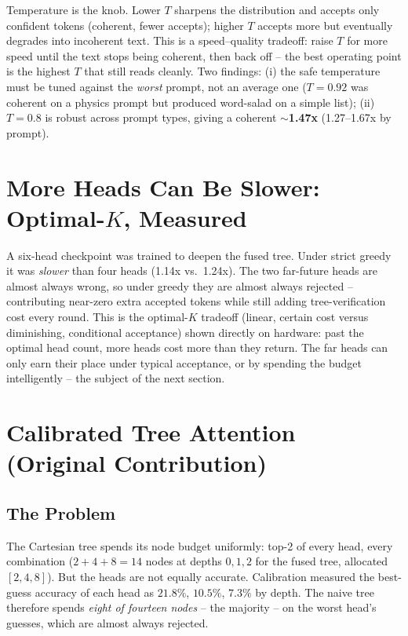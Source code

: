 \documentclass[12pt, a4paper]{article}
\begin{document}
Temperature is the knob. Lower $T$ sharpens the distribution and accepts only confident tokens
(coherent, fewer accepts); higher $T$ accepts more but eventually degrades into incoherent text.
This is a speed--quality tradeoff: raise $T$ for more speed until the text stops being coherent,
then back off -- the best operating point is the highest $T$ that still reads cleanly. Two
findings: (i) the safe temperature must be tuned against the \emph{worst} prompt, not an average
one ($T{=}0.92$ was coherent on a physics prompt but produced word-salad on a simple list);
(ii) $T{=}0.8$ is robust across prompt types, giving a coherent $\sim$\textbf{1.47x} (1.27--1.67x
by prompt).

\section{More Heads Can Be Slower: Optimal-\texorpdfstring{$K$}{K}, Measured}

A six-head checkpoint was trained to deepen the fused tree. Under strict greedy it was
\emph{slower} than four heads (1.14x vs.\ 1.24x). The two far-future heads are almost always
wrong, so under greedy they are almost always rejected -- contributing near-zero extra accepted
tokens while still adding tree-verification cost every round. This is the optimal-$K$ tradeoff
(linear, certain cost versus diminishing, conditional acceptance) shown directly on hardware:
past the optimal head count, more heads cost more than they return. The far heads can only earn
their place under typical acceptance, or by spending the budget intelligently -- the subject of
the next section.

\section{Calibrated Tree Attention (Original Contribution)}

\subsection{The Problem}
The Cartesian tree spends its node budget uniformly: top-2 of every head, every combination
($2+4+8 = 14$ nodes at depths $0,1,2$ for the fused tree, allocated $[2,4,8]$). But the heads
are not equally accurate. Calibration measured the best-guess accuracy of each head as
$21.8\%$, $10.5\%$, $7.3\%$ by depth. The naive tree therefore spends \emph{eight of fourteen
nodes} -- the majority -- on the worst head's guesses, which are almost always rejected.
\end{document}
